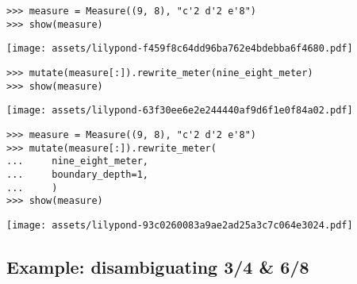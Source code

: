 \begin{comment}
<abjad>
measure = Measure((9, 8), "c'2 d'2 e'8")
show(measure)
</abjad>
\end{comment}

\begin{singlespacing}
\vspace{-0.5\baselineskip}
\begin{lstlisting}
>>> measure = Measure((9, 8), "c'2 d'2 e'8")
>>> show(measure)
\end{lstlisting}
\noindent\texttt{[image: assets/lilypond-f459f8c64dd96ba762e4bdebba6f4680.pdf]}
\end{singlespacing}

\begin{comment}
<abjad>
mutate(measure[:]).rewrite_meter(nine_eight_meter)
show(measure)
</abjad>
\end{comment}

\begin{singlespacing}
\vspace{-0.5\baselineskip}
\begin{lstlisting}
>>> mutate(measure[:]).rewrite_meter(nine_eight_meter)
>>> show(measure)
\end{lstlisting}
\noindent\texttt{[image: assets/lilypond-63f30ee6e2e244440af9d6f1e0f84a02.pdf]}
\end{singlespacing}

\begin{comment}
<abjad>
measure = Measure((9, 8), "c'2 d'2 e'8")
mutate(measure[:]).rewrite_meter(
    nine_eight_meter,
    boundary_depth=1,
    )
show(measure)
</abjad>
\end{comment}

\begin{singlespacing}
\vspace{-0.5\baselineskip}
\begin{lstlisting}
>>> measure = Measure((9, 8), "c'2 d'2 e'8")
>>> mutate(measure[:]).rewrite_meter(
...     nine_eight_meter,
...     boundary_depth=1,
...     )
>>> show(measure)
\end{lstlisting}
\noindent\texttt{[image: assets/lilypond-93c0260083a9ae2ad25a3c7c064e3024.pdf]}
\end{singlespacing}

\subsection{Example: disambiguating 3/4 \& 6/8} %

